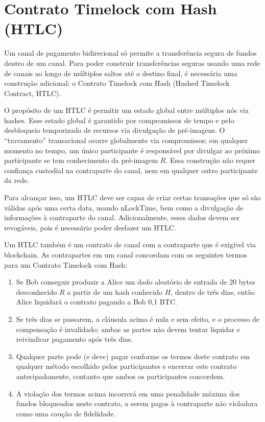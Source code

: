 \documentclass[letterpaper,11pt]{article}
\begin{document}
\section{Contrato Timelock com Hash (HTLC)}

Um canal de pagamento bidirecional só permite a transferência segura de
fundos dentro de um canal. Para poder construir transferências seguras
usando uma rede de canais ao longo de múltiplos saltos até o destino final,
é necessária uma construção adicional: o Contrato Timelock com Hash
(Hashed Timelock Contract, HTLC).

O propósito de um HTLC é permitir um estado global entre múltiplos nós via
hashes. Esse estado global é garantido por compromissos de tempo e pelo
desbloqueio temporizado de recursos via divulgação de pré-imagens. O
``travamento'' transacional ocorre globalmente via compromissos; em qualquer
momento no tempo, um único participante é responsável por divulgar ao
próximo participante se tem conhecimento da pré-imagem $R$. Essa construção
não requer confiança custodial na contraparte do canal, nem em qualquer
outro participante da rede.

Para alcançar isso, um HTLC deve ser capaz de criar certas transações que
só são válidas após uma certa data, usando nLockTime, bem como a divulgação
de informações à contraparte do canal. Adicionalmente, esses dados devem ser
revogáveis, pois é necessário poder desfazer um HTLC.

Um HTLC também é um contrato de canal com a contraparte que é exigível via
blockchain. As contrapartes em um canal concordam com os seguintes termos
para um Contrato Timelock com Hash:

\begin{enumerate}
	\item Se Bob conseguir produzir a Alice um dado aleatório de entrada de
		20 bytes desconhecido $R$ a partir de um hash conhecido $H$,
		dentro de três dias, então Alice liquidará o contrato pagando
		a Bob 0,1 BTC.

	\item Se três dias se passarem, a cláusula acima é nula e sem efeito, e
		o processo de compensação é invalidado; ambas as partes não
		devem tentar liquidar e reivindicar pagamento após três dias.

	\item Qualquer parte pode (e deve) pagar conforme os termos deste
		contrato em qualquer método escolhido pelos participantes e
		encerrar este contrato antecipadamente, contanto que ambos os
		participantes concordem.

	\item A violação dos termos acima incorrerá em uma penalidade máxima dos
		fundos bloqueados neste contrato, a serem pagos à contraparte
		não violadora como uma caução de fidelidade.

\end{enumerate}
\end{document}
